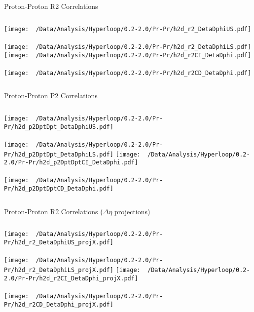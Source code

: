 \documentclass{beamer}
\begin{document}
\begin{frame}{Proton-Proton R2 Correlations}
	\begin{columns}
		\centering
		\texttt{[image: ~/Data/Analysis/Hyperloop/0.2-2.0/Pr-Pr/h2d\_r2\_DetaDphiUS.pdf]}\\~\\
		\texttt{[image: ~/Data/Analysis/Hyperloop/0.2-2.0/Pr-Pr/h2d\_r2\_DetaDphiLS.pdf]}
		\centering
		\texttt{[image: ~/Data/Analysis/Hyperloop/0.2-2.0/Pr-Pr/h2d\_r2CI\_DetaDphi.pdf]}\\~\\
		\texttt{[image: ~/Data/Analysis/Hyperloop/0.2-2.0/Pr-Pr/h2d\_r2CD\_DetaDphi.pdf]}
	\end{columns}
\end{frame}
\begin{frame}{Proton-Proton P2 Correlations}
	\begin{columns}
		\column{0.5\linewidth}
		\centering
		\texttt{[image: ~/Data/Analysis/Hyperloop/0.2-2.0/Pr-Pr/h2d\_p2DptDpt\_DetaDphiUS.pdf]}\\~\\
		\texttt{[image: ~/Data/Analysis/Hyperloop/0.2-2.0/Pr-Pr/h2d\_p2DptDpt\_DetaDphiLS.pdf]}
		\column{0.5\linewidth}
		\centering
		\texttt{[image: ~/Data/Analysis/Hyperloop/0.2-2.0/Pr-Pr/h2d\_p2DptDptCI\_DetaDphi.pdf]}\\~\\
		\texttt{[image: ~/Data/Analysis/Hyperloop/0.2-2.0/Pr-Pr/h2d\_p2DptDptCD\_DetaDphi.pdf]}
	\end{columns}
\end{frame}
\begin{frame}{Proton-Proton R2 Correlations ($\Delta\eta$ projections)}
	\begin{columns}
		\centering
		\texttt{[image: ~/Data/Analysis/Hyperloop/0.2-2.0/Pr-Pr/h2d\_r2\_DetaDphiUS\_projX.pdf]}\\~\\
		\texttt{[image: ~/Data/Analysis/Hyperloop/0.2-2.0/Pr-Pr/h2d\_r2\_DetaDphiLS\_projX.pdf]}
		\centering
		\texttt{[image: ~/Data/Analysis/Hyperloop/0.2-2.0/Pr-Pr/h2d\_r2CI\_DetaDphi\_projX.pdf]}\\~\\
		\texttt{[image: ~/Data/Analysis/Hyperloop/0.2-2.0/Pr-Pr/h2d\_r2CD\_DetaDphi\_projX.pdf]}
	\end{columns}
\end{frame}
\end{document}
